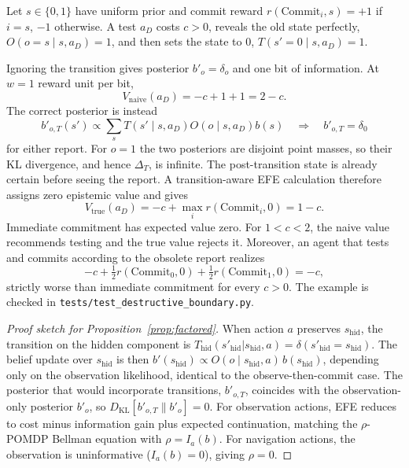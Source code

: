 \documentclass[runningheads]{llncs}
\begin{document}
\begin{example}
\label{ex:destructive}
Let $s\in\{0,1\}$ have uniform prior and commit reward $r(\mathrm{Commit}_i,s)=+1$ if $i=s$, $-1$ otherwise. A test $a_D$ costs $c>0$, reveals the old state perfectly, $O(o=s\mid s,a_D)=1$, and then sets the state to $0$, $T(s'=0\mid s,a_D)=1$.

Ignoring the transition gives posterior $b'_o=\delta_o$ and one bit of information. At $w=1$ reward unit per bit,
\[
V_{\mathrm{naive}}(a_D)=-c+1+1=2-c.
\]
The correct posterior is instead
\[
b'_{o,T}(s')\propto\sum_s T(s'\mid s,a_D)O(o\mid s,a_D)b(s)\quad\Longrightarrow\quad b'_{o,T}=\delta_0
\]
for either report. For $o=1$ the two posteriors are disjoint point masses, so their KL divergence, and hence $\Delta_T$, is infinite. The post-transition state is already certain before seeing the report. A transition-aware EFE calculation therefore assigns zero epistemic value and gives
\[
V_{\mathrm{true}}(a_D)=-c+\max_i r(\mathrm{Commit}_i,0)=1-c.
\]
Immediate commitment has expected value zero. For $1<c<2$, the naive value recommends testing and the true value rejects it. Moreover, an agent that tests and commits according to the obsolete report realizes
\[
-c+\tfrac12r(\mathrm{Commit}_0,0)+\tfrac12r(\mathrm{Commit}_1,0)=-c,
\]
strictly worse than immediate commitment for every $c>0$. The example is checked in \texttt{tests/\allowbreak test\_\allowbreak destructive\_\allowbreak boundary.py}.
\end{example}

\begin{proof}[Proof sketch for Proposition~\ref{prop:factored}]
When action $a$ preserves $s_{\mathrm{hid}}$, the transition on the hidden component is $T_{\mathrm{hid}}(s'_{\mathrm{hid}} | s_{\mathrm{hid}}, a) = \delta(s'_{\mathrm{hid}} = s_{\mathrm{hid}})$. The belief update over $s_{\mathrm{hid}}$ is then $b'(s_{\mathrm{hid}}) \propto O(o \mid s_{\mathrm{hid}}, a)\, b(s_{\mathrm{hid}})$, depending only on the observation likelihood, identical to the observe-then-commit case. The posterior that would incorporate transitions, $b'_{o,T}$, coincides with the observation-only posterior $b'_o$, so $D_{\mathrm{KL}}[b'_{o,T} \| b'_o] = 0$. For observation actions, EFE reduces to cost minus information gain plus expected continuation, matching the $\rho$-POMDP Bellman equation with $\rho = I_a(b)$. For navigation actions, the observation is uninformative ($I_a(b) = 0$), giving $\rho = 0$.
\end{proof}
\end{document}
